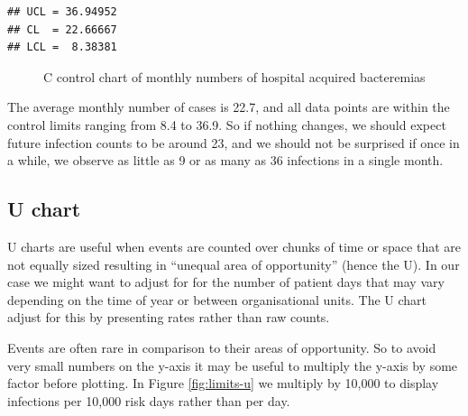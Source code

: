 \documentclass[
]{book}
\makeatletter
\newcommand*\pandocbounded[1]{%
  \sbox\pandoc@box{#1}%
  \Gscale@div\@tempa{\textheight}{\dimexpr\ht\pandoc@box+\dp\pandoc@box\relax}%
  \Gscale@div\@tempb{\linewidth}{\wd\pandoc@box}%
  \ifdim\@tempb\p@<\@tempa\p@\let\@tempa\@tempb\fi%
  \ifdim\@tempa\p@<\p@\scalebox{\@tempa}{\usebox\pandoc@box}%
  \else\usebox{\pandoc@box}%
  \fi%
}
\makeatother
\begin{document}
\begin{verbatim}
## UCL = 36.94952 
## CL  = 22.66667 
## LCL =  8.38381
\end{verbatim}

\begin{figure}
\centering
\pandocbounded{}
\caption{\label{fig:limits-c}C control chart of monthly numbers of hospital acquired bacteremias}
\end{figure}

The average monthly number of cases is 22.7, and all data points are within the control limits ranging from 8.4 to 36.9. So if nothing changes, we should expect future infection counts to be around 23, and we should not be surprised if once in a while, we observe as little as 9 or as many as 36 infections in a single month.

\subsection{U chart}\label{u-chart}

U charts are useful when events are counted over chunks of time or space that are not equally sized resulting in ``unequal area of opportunity'' (hence the U). In our case we might want to adjust for for the number of patient days that may vary depending on the time of year or between organisational units. The U chart adjust for this by presenting rates rather than raw counts.

Events are often rare in comparison to their areas of opportunity. So to avoid very small numbers on the y-axis it may be useful to multiply the y-axis by some factor before plotting. In Figure \ref{fig:limits-u} we multiply by 10,000 to display infections per 10,000 risk days rather than per day.
\end{document}
